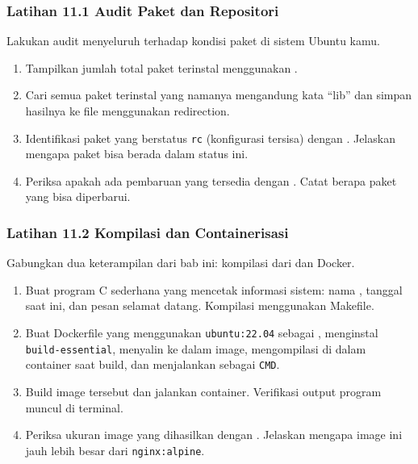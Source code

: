 \subsubsection*{Latihan 11.1 Audit Paket dan Repositori}
Lakukan audit menyeluruh terhadap kondisi paket di sistem Ubuntu kamu.
\begin{enumerate}
    \item Tampilkan jumlah total paket terinstal menggunakan .
    \item Cari semua paket terinstal yang namanya mengandung kata ``lib'' dan
        simpan hasilnya ke file  menggunakan redirection.
    \item Identifikasi paket yang berstatus \texttt{rc} (konfigurasi tersisa)
        dengan . Jelaskan mengapa paket bisa berada
        dalam status ini.
\item Periksa apakah ada pembaruan yang tersedia dengan . Catat berapa paket yang bisa diperbarui.
\end{enumerate}

\subsubsection*{Latihan 11.2 Kompilasi dan Containerisasi}
Gabungkan dua keterampilan dari bab ini: kompilasi dari  dan Docker.
\begin{enumerate}
    \item Buat program C sederhana yang mencetak informasi sistem: nama ,
        tanggal saat ini, dan pesan selamat datang. Kompilasi menggunakan Makefile.
    \item Buat Dockerfile yang menggunakan \texttt{ubuntu:22.04} sebagai ,
        menginstal \texttt{build-essential}, menyalin  ke
        dalam image, mengompilasi di dalam container saat build, dan menjalankan
         sebagai \texttt{CMD}.
    \item Build image tersebut dan jalankan container. Verifikasi output program
        muncul di terminal.
\item Periksa ukuran image yang dihasilkan dengan .
        Jelaskan mengapa image ini jauh lebih besar dari \texttt{nginx:alpine}.
\end{enumerate}

